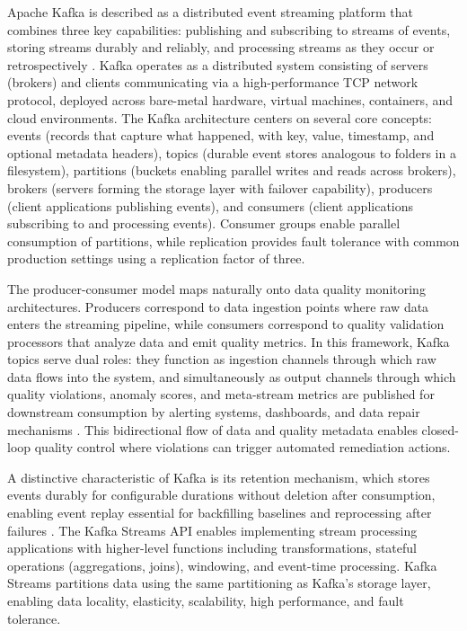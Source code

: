 Apache Kafka is described as a distributed event streaming platform that combines three key capabilities: publishing and subscribing to streams of events, storing streams durably and reliably, and processing streams as they occur or retrospectively \citep{kafkaintro2024}. Kafka operates as a distributed system consisting of servers (brokers) and clients communicating via a high-performance TCP network protocol, deployed across bare-metal hardware, virtual machines, containers, and cloud environments. The Kafka architecture centers on several core concepts: events (records that capture what happened, with key, value, timestamp, and optional metadata headers), topics (durable event stores analogous to folders in a filesystem), partitions (buckets enabling parallel writes and reads across brokers), brokers (servers forming the storage layer with failover capability), producers (client applications publishing events), and consumers (client applications subscribing to and processing events). Consumer groups enable parallel consumption of partitions, while replication provides fault tolerance with common production settings using a replication factor of three.

The producer-consumer model maps naturally onto data quality monitoring architectures. Producers correspond to data ingestion points where raw data enters the streaming pipeline, while consumers correspond to quality validation processors that analyze data and emit quality metrics. In this framework, Kafka topics serve dual roles: they function as ingestion channels through which raw data flows into the system, and simultaneously as output channels through which quality violations, anomaly scores, and meta-stream metrics are published for downstream consumption by alerting systems, dashboards, and data repair mechanisms \citep{kafkaintro2024}. This bidirectional flow of data and quality metadata enables closed-loop quality control where violations can trigger automated remediation actions.

A distinctive characteristic of Kafka is its retention mechanism, which stores events durably for configurable durations without deletion after consumption, enabling event replay essential for backfilling baselines and reprocessing after failures \citep{kafkaintro2024}. The Kafka Streams API enables implementing stream processing applications with higher-level functions including transformations, stateful operations (aggregations, joins), windowing, and event-time processing. Kafka Streams partitions data using the same partitioning as Kafka's storage layer, enabling data locality, elasticity, scalability, high performance, and fault tolerance.

